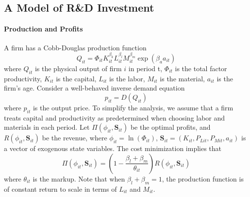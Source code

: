 \subsection{A Model of R\&D Investment}

\paragraph{Production and Profits} A firm has a Cobb-Douglas production function
\begin{equation}
Q_{it} = \Phi_{it}K_{it}^{\beta_{k}}L_{it}^{\beta_l}M_{it}^{\beta_m}\exp{(\beta_a a_{it})}
\end{equation}
where $Q_{it}$ is the physical output of firm $i$ in period t, $\Phi_{it}$ is the total factor productivity, $K_{it}$ is the capital, $L_{it}$ is the labor, $M_{it}$ is the material, $a_{it}$ is the firm's age. Consider a well-behaved inverse demand equation
\begin{equation}
    p_{it} = D(Q_{it})
\end{equation}
where $p_{it}$ is the output price. To simplify the analysis, we assume that a firm treats capital and productivity as predetermined when choosing labor and materials in each period. Let $\Pi(\phi_{it},\mathbf{S}_{it})$ be the optimal profits, and $R(\phi_{it},\mathbf{S}_{it})$ be the revenue, where $\phi_{it}=\ln(\Phi_{it})$, $\mathbf{S}_{it}=(K_{it}, P_{Lit}, P_{Mit}, a_{it})$ is a vector of exogenous state variables. The cost minimization implies that
\begin{equation}
    \Pi(\phi_{it},\mathbf{S}_{it}) = (1-\frac{\beta_l+\beta_m}{\theta_{it}})R(\phi_{it},\mathbf{S}_{it})
\end{equation}
where $\theta_{it}$ is the markup. Note that when $\beta_l+\beta_m=1$, the production function is of constant return to scale in terms of $L_{it}$ and $M_{it}$.

